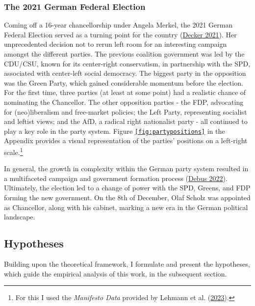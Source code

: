 \documentclass[a4paper,11pt]{article}
\begin{document}
\hypertarget{the-2021-german-federal-election}{%
\subsubsection{The 2021 German Federal Election}\label{the-2021-german-federal-election}}

Coming off a 16-year chancellorship under Angela Merkel, the 2021 German Federal Election served as a turning point for the country (\protect\hyperlink{ref-deckerWahljahr20212021}{Decker 2021}). Her unprecedented decision not to rerun left room for an interesting campaign amongst the different parties. The previous coalition government was led by the CDU/CSU, known for its center-right conservatism, in partnership with the SPD, associated with center-left social democracy. The biggest party in the opposition was the Green Party, which gained considerable momentum before the election. For the first time, three parties (at least at some point) had a realistic chance of nominating the Chancellor. The other opposition parties - the FDP, advocating for (neo)liberalism and free-market policies; the Left Party, representing socialist and leftist views; and the AfD, a radical right nationalist party - all continued to play a key role in the party system. Figure \texttt{\ref{fig:partypositions}} in the Appendix provides a visual representation of the parties' positions on a left-right scale.\footnote{For this I used the \emph{Manifesto Data} provided by Lehmann et al. (\protect\hyperlink{ref-lehmannManifestoProjectDataset2023}{2023}).}

In general, the growth in complexity within the German party system resulted in a multifaceted campaign and government formation process (\protect\hyperlink{ref-debusParteienwettbewerbUndWahrscheinlichkeit2022}{Debus 2022}). Ultimately, the election led to a change of power with the SPD, Greens, and FDP forming the new government. On the 8th of December, Olaf Scholz was appointed as Chancellor, along with his cabinet, marking a new era in the German political landscape.

\hypertarget{hypotheses}{%
\subsection{Hypotheses}\label{hypotheses}}

Building upon the theoretical framework, I formulate and present the hypotheses, which guide the empirical analysis of this work, in the subsequent section.
\end{document}
